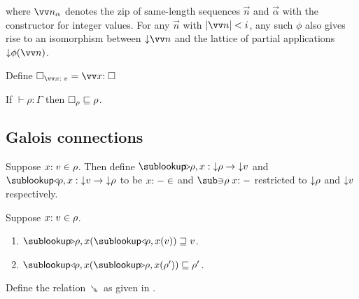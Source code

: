 \noindent where $\vec{\annInt{n}{\alpha}}$ denotes the zip of same-length sequences $\vec{n}$ and $\vec{\alpha}$ with the constructor for integer values. For any $\vec{n}$ with $\length{\vec{n}} \numlt i$, any such $\phi$ also gives rise to an isomorphism between $\Below{\vec{n}}$ and the lattice of partial applications $\Below{\exPrimOp{\phi}{\vec{n}}}$.




\begin{definition}
Define $\hole_{\vec{\bind{x}{v}}} = \vec{\bind{x}{\hole}}$
\end{definition}

\begin{lemma}
\label{lem:core-language:hole-env}If $\vdash \rho: \Gamma$ then $\square_{\rho} \sqsubseteq \rho$.
\end{lemma}

\subsection{Galois connections}
\label{sec:data-dependencies:analysis:galois-connections}

\begin{definition}
   Suppose $x{:}\;v\in{\rho}$. Then define $\envLookupFwdF{\rho,x}: \Below{\rho} \to \Below{v}$ and $\envLookupBwdF{\rho,x}: \Below{v} \to \Below{\rho}$ to be $x{:}\;-\in$ and $\envLookupBwdR{\rho}\bind{x}{-}$ restricted to ${\downarrow}{\rho}$ and ${\downarrow}{v}$ respectively.
\end{definition}

\begin{lemma}
\label{lem:core-language:env-get-put}Suppose $x{:}\;v\in{\rho}$.
\begin{enumerate}
   \item \label{lem:core-language:env-get-put:1} $\envLookupFwdF{\rho,x}(\envLookupBwdF{\rho,x}(v)) \geq v$.
   \item \label{lem:core-language:env-get-put:2} $\envLookupBwdF{\rho,x}(\envLookupFwdF{\rho,x}(\rho')) \leq \rho'$.
\end{enumerate}
\end{lemma}

\begin{definition}
   \label{def:core-language:closeDefs-bwd}
   Define the relation $\closeDefsBwdR$ as given in .
\end{definition}

